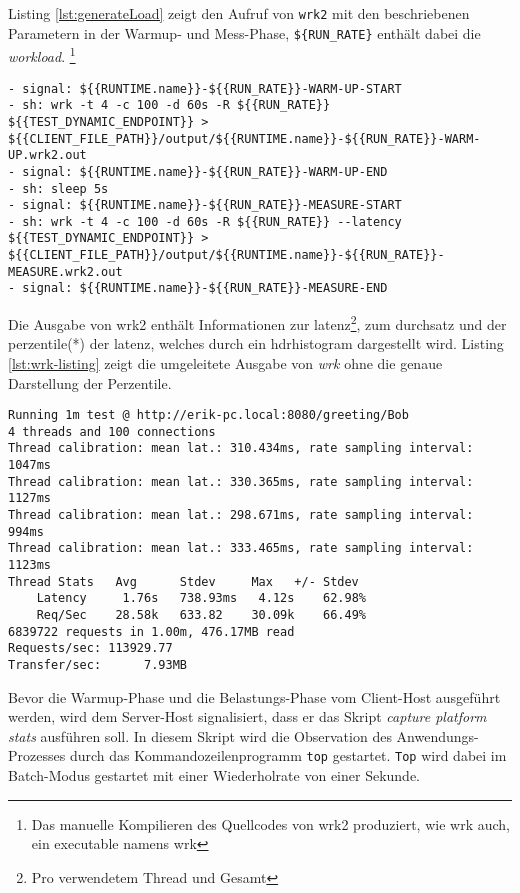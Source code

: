Listing \ref*{lst:generateLoad} zeigt den Aufruf von \verb|wrk2| mit den beschriebenen Parametern in der Warmup- und Mess-Phase,
\verb|${RUN_RATE}| enthält dabei die \textit{workload}.
\footnote{Das manuelle Kompilieren des Quellcodes von wrk2 produziert, wie wrk auch, ein executable namens wrk}

\begin{lstlisting}[caption=Auszug des qDup Skripts generate load, captionpos=b, label=lst:generateLoad]
- signal: ${{RUNTIME.name}}-${{RUN_RATE}}-WARM-UP-START
- sh: wrk -t 4 -c 100 -d 60s -R ${{RUN_RATE}} ${{TEST_DYNAMIC_ENDPOINT}} > ${{CLIENT_FILE_PATH}}/output/${{RUNTIME.name}}-${{RUN_RATE}}-WARM-UP.wrk2.out
- signal: ${{RUNTIME.name}}-${{RUN_RATE}}-WARM-UP-END
- sh: sleep 5s
- signal: ${{RUNTIME.name}}-${{RUN_RATE}}-MEASURE-START
- sh: wrk -t 4 -c 100 -d 60s -R ${{RUN_RATE}} --latency ${{TEST_DYNAMIC_ENDPOINT}} > ${{CLIENT_FILE_PATH}}/output/${{RUNTIME.name}}-${{RUN_RATE}}-MEASURE.wrk2.out
- signal: ${{RUNTIME.name}}-${{RUN_RATE}}-MEASURE-END
   \end{lstlisting}

Die Ausgabe von wrk2 enthält Informationen zur \Gls{latenz}\footnote{Pro verwendetem Thread und Gesamt},
zum \Gls{durchsatz} und der \Gls{perzentile}(*) der \Gls{latenz}, welches durch ein \acrshort{hdrhistogram} dargestellt wird.
Listing \ref*{lst:wrk-listing} zeigt die umgeleitete Ausgabe von \textit{wrk} ohne die genaue Darstellung der Perzentile.

\begin{lstlisting}[caption=Beispiel für Ausgabe von wrk,captionpos=b, label=lst:wrk-listing]
Running 1m test @ http://erik-pc.local:8080/greeting/Bob
4 threads and 100 connections
Thread calibration: mean lat.: 310.434ms, rate sampling interval: 1047ms
Thread calibration: mean lat.: 330.365ms, rate sampling interval: 1127ms
Thread calibration: mean lat.: 298.671ms, rate sampling interval: 994ms
Thread calibration: mean lat.: 333.465ms, rate sampling interval: 1123ms
Thread Stats   Avg      Stdev     Max   +/- Stdev
	Latency     1.76s   738.93ms   4.12s    62.98%
	Req/Sec    28.58k   633.82    30.09k    66.49%
6839722 requests in 1.00m, 476.17MB read
Requests/sec: 113929.77
Transfer/sec:      7.93MB
\end{lstlisting}

Bevor die Warmup-Phase und die Belastungs-Phase vom Client-Host ausgeführt werden, wird dem Server-Host signalisiert, dass
er das Skript \textit{capture platform stats} ausführen soll.
In diesem Skript wird die Observation des Anwendungs-Prozesses durch das Kommandozeilenprogramm \verb|top| gestartet.
\verb|Top| wird dabei im Batch-Modus gestartet mit einer Wiederholrate von einer Sekunde.

